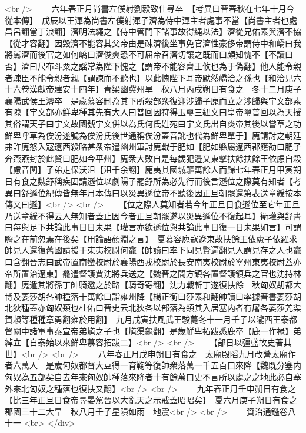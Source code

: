 <br />
　　六年春正月尚書左僕射劉毅致仕尋卒　【考異曰晉春秋在七年十月今從本傳】　戊辰以王渾為尚書左僕射渾子濟為侍中渾主者處事不當【尚書主者也處昌呂翻當丁浪翻】濟明法繩之【侍中管門下諸事故得䋲以法】濟從兄佑素與濟不協【從才容翻】因毁濟不能容其父帝由是疎濟後坐事免官濟性豪侈帝謂侍中和嶠曰我將罵濟而後官之如何嶠曰濟俊爽恐不可屈帝召濟切讓之既而曰頗知愧不【不讀曰否】濟曰尺布斗粟之謡常為陛下愧之【謂帝不能容齊王攸也為于偽翻】他人能令親者疎臣不能令親者親【謂諫而不聽也】以此愧陛下耳帝默然嶠洽之孫也【和洽見六十六卷漢獻帝建安十四年】青梁幽冀州旱　秋八月丙戌朔日有食之　冬十二月庚子襄陽武侯王濬卒　是歲慕容刪為其下所殺部衆復迎涉歸子廆而立之涉歸與宇文部素有隙【宇文部亦鮮卑種其先有大人曰普回因狩得玉璽三紐文曰皇帝璽普回以為天授其俗謂天子曰宇文故國號宇文併以為氏何氏姓苑曰宇文氏出自炎帝其後以嘗草之功鮮卑呼草為俟汾遂號為俟汾氏後世通稱俟汾蓋音訛也代為鮮卑單于】廆請討之朝廷弗許廆怒入宼遼西殺略甚衆帝遣幽州軍討廆戰于肥如【肥如縣屬遼西郡應劭曰肥子奔燕燕封於此賢曰肥如今平州】廆衆大敗自是每歲犯邉又東擊扶餘扶餘王依慮自殺【慮音閭】子弟走保沃沮【沮千余翻】廆夷其國城驅萬餘人而歸七年春正月甲寅朔日有食之魏舒稱疾固請遜位以劇陽子罷舒所為必先行而後言遜位之際莫有知者【考異曰舒遜位紀傳皆無年月本傳曰以災異遜位帝不聽後因正旦朝罷還第表送章綬按本傳又曰遜】<br />
<br />
　　【位之際人莫知者若今年正旦日食遜位至它年正旦乃送章綬不得云人無知者蓋止因今者正旦朝罷遂以災異遜位不復起耳】衛瓘與舒書曰每與足下共論此事日日未果【瓘言亦欲遜位與共論此事日復一日未果如言】可謂瞻之在前忽焉在後矣【用論語顔淵之言】　夏慕容廆寇遼東故扶餘王依慮子依羅求帥見人還復舊國請援于東夷校尉何龕【帥讀曰率下同見賢遍翻見人謂見存之人也龕口含翻晉志曰武帝置南蠻校尉於襄陽西戎校尉於長安南夷校尉於寧州東夷校尉蓋亦帝所置治遼東】龕遣督護賈沈將兵送之【魏晉之間方鎮各置督護領兵之官也沈持林翻】廆遣其將孫丁帥騎邀之於路【騎奇寄翻】沈力戰斬丁遂復扶餘　秋匈奴胡都大博及萎莎胡各帥種落十萬餘口詣雍州降【楊正衡曰莎素和翻帥讀曰率據晉書萎莎胡北狄種蓋亦匈奴類也杜佑曰晉史云北狄各以部落為類其入居塞内者有屠各萎莎羌渠賀賴等種種章勇翻雍於用翻】　九月戊寅扶風武王駿薨冬十一月壬子以隴西王泰都督關中諸軍事泰宣帝弟馗之子也【馗渠龜翻】是歲鮮卑拓跋悉鹿卒【鹿一作禄】弟綽立【自泰始以來鮮卑慕容拓跋二】<br />
<br />
　　【部日以彊盛故史著其世】<br />
<br />
　　八年春正月戊申朔日有食之　太廟殿䧟九月改營太廟作者六萬人　是歲匈奴都督大豆得一育鞠等復帥衆落萬一千五百口來降【魏既分塞内匈奴為五部矣自去年來匈奴帥種落來降者十有餘萬口史不言所以處之之地此必自塞外來北匈奴之種落也復扶又翻】<br />
<br />
　　九年春正月壬申朔日有食之【比三年正旦日食帝尋晏駕晉以大亂天之示戒蓋昭昭矣】　夏六月庚子朔日有食之　郡國三十二大旱　秋八月壬子星隕如雨　地震<br />
<br />
　　資治通鑑卷八十一  <br>
   </div> 

